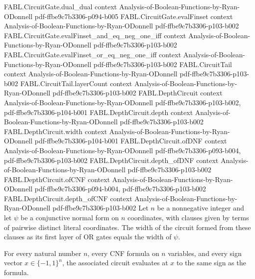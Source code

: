 \begin{theorem}
\proofstep
  {FABL.CircuitGate.dual_dual}
  {context}
  {Analysis-of-Boolean-Functions-by-Ryan-ODonnell}
  {pdf-ffbe9c7b3306-p094-b005}
\proofstep
  {FABL.CircuitGate.evalFinset}
  {context}
  {Analysis-of-Boolean-Functions-by-Ryan-ODonnell}
  {pdf-ffbe9c7b3306-p103-b002}
\proofstep
  {FABL.CircuitGate.evalFinset_and_eq_neg_one_iff}
  {context}
  {Analysis-of-Boolean-Functions-by-Ryan-ODonnell}
  {pdf-ffbe9c7b3306-p103-b002}
\proofstep
  {FABL.CircuitGate.evalFinset_or_eq_neg_one_iff}
  {context}
  {Analysis-of-Boolean-Functions-by-Ryan-ODonnell}
  {pdf-ffbe9c7b3306-p103-b002}
\proofstep
  {FABL.CircuitTail}
  {context}
  {Analysis-of-Boolean-Functions-by-Ryan-ODonnell}
  {pdf-ffbe9c7b3306-p103-b002}
\proofstep
  {FABL.CircuitTail.layerCount}
  {context}
  {Analysis-of-Boolean-Functions-by-Ryan-ODonnell}
  {pdf-ffbe9c7b3306-p103-b002}
\proofstep
  {FABL.DepthCircuit}
  {context}
  {Analysis-of-Boolean-Functions-by-Ryan-ODonnell}
  {pdf-ffbe9c7b3306-p103-b002,
    pdf-ffbe9c7b3306-p104-b001}
\proofstep
  {FABL.DepthCircuit.depth}
  {context}
  {Analysis-of-Boolean-Functions-by-Ryan-ODonnell}
  {pdf-ffbe9c7b3306-p103-b002}
\proofstep
  {FABL.DepthCircuit.width}
  {context}
  {Analysis-of-Boolean-Functions-by-Ryan-ODonnell}
  {pdf-ffbe9c7b3306-p104-b001}
\proofstep
  {FABL.DepthCircuit.ofDNF}
  {context}
  {Analysis-of-Boolean-Functions-by-Ryan-ODonnell}
  {pdf-ffbe9c7b3306-p093-b004,
    pdf-ffbe9c7b3306-p103-b002}
\proofstep
  {FABL.DepthCircuit.depth_ofDNF}
  {context}
  {Analysis-of-Boolean-Functions-by-Ryan-ODonnell}
  {pdf-ffbe9c7b3306-p103-b002}
\proofstep
  {FABL.DepthCircuit.ofCNF}
  {context}
  {Analysis-of-Boolean-Functions-by-Ryan-ODonnell}
  {pdf-ffbe9c7b3306-p094-b004,
    pdf-ffbe9c7b3306-p103-b002}
\proofstep
  {FABL.DepthCircuit.depth_ofCNF}
  {context}
  {Analysis-of-Boolean-Functions-by-Ryan-ODonnell}
  {pdf-ffbe9c7b3306-p103-b002}
Let $n$ be a nonnegative integer and let $\psi$ be a conjunctive normal form on $n$
coordinates, with clauses given by terms of pairwise distinct literal coordinates. The
width of the circuit formed from these clauses as its first layer of OR gates equals the
width of $\psi$.
\end{theorem}

\begin{theorem}
\label{FABL.DepthCircuit.eval_ofCNF}
\leanok
{}
For every natural number $n$, every CNF formula on $n$ variables, and every sign vector
$x\in\{-1,1\}^n$, the associated circuit evaluates at $x$ to the same sign as the
formula.
\end{theorem}

